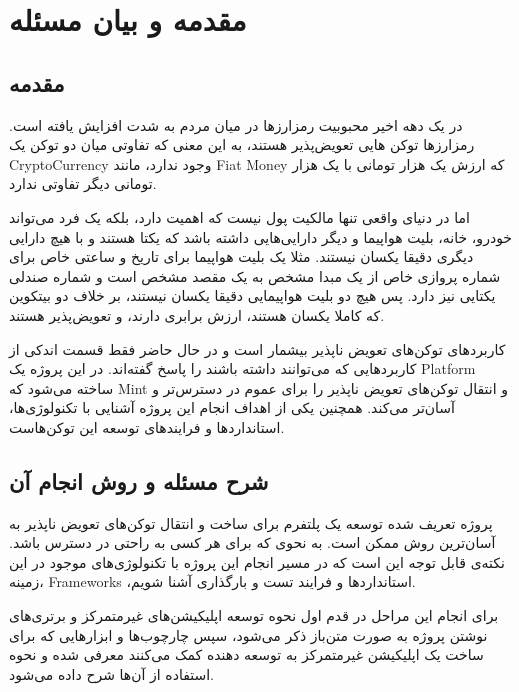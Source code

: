 
\chapter{مقدمه و بیان مسئله}

\section{مقدمه}
در یک دهه اخیر محبوبیت رمزارز‌ها در میان مردم به شدت افزایش یافته است.
رمزارزها توکن هایی تعویض‌پذیر هستند، به این معنی که تفاوتی میان دو توکن یک
\gls{CryptoCurrency}
وجود ندارد، مانند
\gls{Fiat Money}
که ارزش یک هزار تومانی با یک هزار تومانی دیگر تفاوتی ندارد.

اما در دنیای واقعی تنها مالکیت پول نیست که اهمیت دارد،
بلکه یک فرد می‌تواند خودرو، خانه، بلیت هواپیما و دیگر دارایی‌هایی داشته باشد که یکتا هستند و
با هیچ دارایی دیگری دقیقا یکسان نیستند.
مثلا یک بلیت هواپیما برای تاریخ و ساعتی خاص برای شماره پروازی خاص از یک مبدا مشخص به یک مقصد مشخص است و
شماره صندلی یکتایی نیز دارد.
پس هیچ دو بلیت هواپیمایی دقیقا یکسان نیستند،
بر خلاف دو بیتکوین که کاملا یکسان هستند، ارزش برابری دارند، و تعویض‌پذیر هستند.

کاربردهای توکن‌های تعویض ناپذیر بیشمار است و
در حال حاضر فقط قسمت اندکی از کاربردهایی که می‌توانند داشته باشند را پاسخ گفته‌اند.
در این پروژه یک
\gls{Platform}
ساخته می‌شود که
\gls{Mint}
و انتقال توکن‌های تعویض ناپذیر را برای عموم در دسترس‌تر و آسان‌تر می‌کند.
همچنین یکی از اهداف انجام این پروژه آشنایی با تکنولوژی‌ها، استاندارد‌ها و فرایند‌های توسعه این توکن‌هاست.


\section{شرح مسئله و روش انجام آن}
پروژه تعریف شده توسعه یک پلتفرم برای ساخت و انتقال توکن‌های تعویض ناپذیر به آسان‌ترین روش ممکن است.
به نحوی که برای هر کسی به راحتی در دسترس باشد.
نکته‌ی قابل توجه‌ این است که در مسیر انجام این پروژه با تکنولوژی‌های موجود در این زمینه، 
\glspl{Framework}
،استاندارد‌ها و فرایند تست و بارگذاری آشنا شویم.

برای انجام این مراحل در قدم اول نحوه توسعه اپلیکیشن‌های غیرمتمرکز و
برتری‌های نوشتن پروژه به صورت متن‌باز ذکر می‌شود،
سپس چارچوب‌ها و ابزار‌هایی که برای ساخت یک اپلیکیشن غیرمتمرکز به توسعه دهنده کمک می‌کنند معرفی شده
و نحوه استفاده از آن‌ها شرح داده می‌شود.

